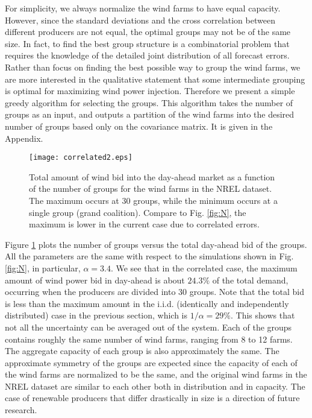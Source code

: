 \documentclass[journal]{IEEEtran}
\begin{document}
For simplicity, we always normalize the wind farms to have equal capacity. However, since the standard deviations and the cross correlation between different producers are not equal, the optimal groups may not be of the same size. In fact, to find the best group structure is a combinatorial problem that requires the knowledge of the detailed joint distribution of all forecast errors. Rather than focus on finding the best possible way to group the wind farms,  we are more interested in the qualitative statement that some intermediate grouping is optimal for maximizing wind power injection. Therefore we present a simple greedy algorithm for selecting the groups. This algorithm  takes the number of groups as an input, and outputs a partition of the wind farms into the desired number of groups based only on the covariance matrix. It is given in the Appendix.
\begin{figure}[!t]
\hspace{-0.1cm}
\texttt{[image: correlated2.eps]}
\caption{Total amount of wind bid into the day-ahead market as a function of the number of groups for the wind farms in the NREL dataset. The maximum occurs at 30 groups, while the minimum occurs at a single group (grand coalition). Compare to Fig. \ref{fig:N}, the maximum is lower in the current case due to correlated errors.  }
\label{fig:correlated}
\end{figure}

Figure \ref{fig:correlated} plots the number of groups versus the total day-ahead bid of the groups. All the parameters are the same with respect to the simulations shown in Fig. \ref{fig:N}, in particular, $\alpha=3.4$. We see that in the correlated case, the maximum amount of wind power bid in day-ahead is about $24.3\%$ of the total demand, occurring when the producers are divided into 30 groups. Note that the total bid is less than the maximum amount in the i.i.d. (identically and independently distributed) case in the previous section, which is $1/\alpha=29\%$. This shows that not all the uncertainty can be averaged out of the system. Each of the groups contains roughly the same number of wind farms, ranging from 8 to 12 farms. The aggregate capacity of each group is also approximately the same. The approximate symmetry of the groups are expected since the capacity of each of the wind farms are normalized to be the same, and the original wind farms in the NREL dataset are similar to each other both in distribution and in capacity. The case of renewable producers that differ drastically in size is a direction of future research. 
\end{document}
